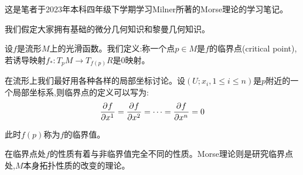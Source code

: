 \documentclass{package/fancy-book}
\begin{document}

\tableofcontents

\quad
\newpage
这是笔者于2023年本科四年级下学期学习Milner所著的Morse理论的学习笔记。

我们假定大家拥有基础的微分几何知识和黎曼几何知识。

设$f$是流形$M$上的光滑函数。我们定义:称一个点$p\in M$是$f$的临界点(critical point),若诱导映射$f_*:T_pM \to T_{f(p)}R$是$0$映射。

在流形上我们最好用各种各样的局部坐标讨论。设$(U;x_i,1\leq i \leq n)$是$p$附近的一个局部坐标系,则临界点的定义可以写为:
\begin{align}
	\frac{\partial^{} f}{\partial {x^1}^{}}=\frac{\partial^{} f}{\partial {x^2}^{}}=\dots=\frac{\partial^{} f}{\partial {x^n}^{}}=0
\end{align}

此时$f(p)$称为$f$的临界值。

在临界点处$f$的性质有着与非临界值完全不同的性质。Morse理论则是研究临界点处,$M$本身拓扑性质的改变的理论。

\end{document}
